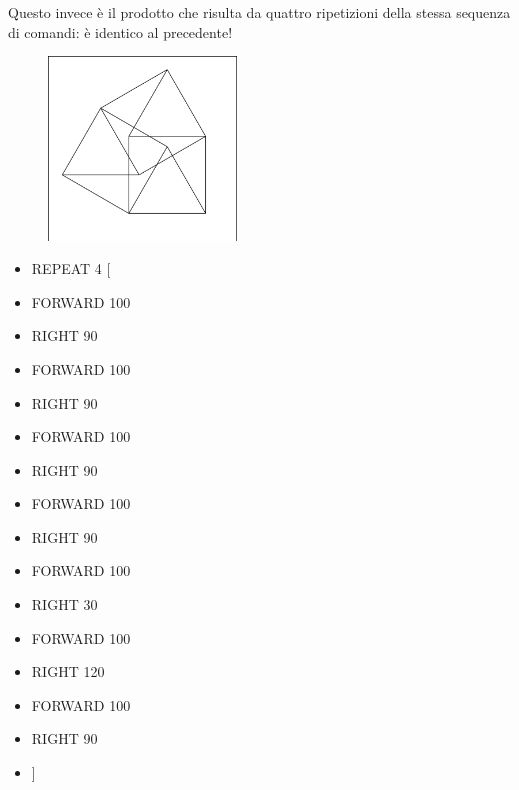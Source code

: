 Questo invece è il prodotto che risulta da quattro ripetizioni della stessa
sequenza di comandi: è identico al precedente!

\begin{minipage}{0.5\textwidth}
\begin{figure}[H]
   \includegraphics[width=5.0cm,trim=4 4 6 4,clip]{./images/marta/mar-9.png}
   \label{mar-10}
\end{figure}
\end{minipage} \hfill
\begin{minipage}{0.45\textwidth}
\begin{itemize}[itemsep=-3pt,parsep=2pt]
\item[] \hspace{0.5cm} REPEAT 4 [
\item[] \hspace{0.5cm} 	FORWARD 100
\item[] \hspace{0.5cm} 	RIGHT 90
\item[] \hspace{0.5cm} 	FORWARD 100
\item[] \hspace{0.5cm} 	RIGHT 90
\item[] \hspace{0.5cm} 	FORWARD 100
\item[] \hspace{0.5cm} 	RIGHT 90
\item[] \hspace{0.5cm} 	FORWARD 100
\item[] \hspace{0.5cm} 	RIGHT 90
\item[] \hspace{0.5cm} 	FORWARD 100
\item[] \hspace{0.5cm} 	RIGHT 30
\item[] \hspace{0.5cm} 	FORWARD 100
\item[] \hspace{0.5cm} 	RIGHT 120
\item[] \hspace{0.5cm} 	FORWARD 100
\item[] \hspace{0.5cm} 	RIGHT 90
\item[] \hspace{0.5cm} 	]          
\end{itemize}          	          
\end{minipage}

